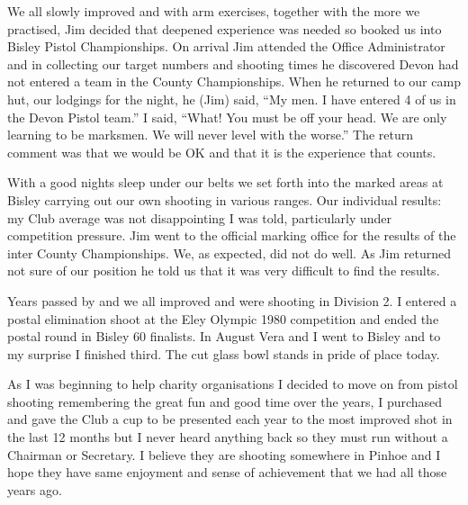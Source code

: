We all slowly improved and with arm exercises, together with the more we
practised, Jim decided that deepened experience was needed so booked us into
Bisley Pistol Championships.  On arrival Jim attended the Office Administrator
and in collecting our target numbers and shooting times he discovered Devon had
not entered a team in the County Championships.  When he returned to our camp
hut, our lodgings for the night, he (Jim) said, ``My men.  I have entered 4 of
us in the Devon Pistol team.''  I said, ``What! You must be off your head.  We
are only learning to be marksmen.  We will never level with the worse.''  The
return comment was that we would be OK and that it is the experience that
counts.

With a good nights sleep under our belts we set forth into the marked areas at
Bisley carrying out our own shooting in various ranges.  Our individual
results: my Club average was not disappointing I was told, particularly under
competition pressure.  Jim went to the official marking office for the results
of the inter County Championships.  We, as expected, did not do well.  As Jim
returned not sure of our position he told us that it was very difficult to find
the results.

Years passed by and we all improved and were shooting in Division 2.  I entered
a postal elimination shoot at the Eley Olympic 1980 competition and ended the
postal round in Bisley 60 finalists.  In August Vera and I went to Bisley and
to my surprise I finished third.  The cut glass bowl stands in pride of place
today.

As I was beginning to help charity organisations I decided to move on from
pistol shooting remembering the great fun and good time over the years, I
purchased and gave the Club a cup to be presented each year to the most
improved shot in the last 12 months but I never heard anything back so they
must run without a Chairman or Secretary.  I believe they are shooting
somewhere in Pinhoe and I hope they have same enjoyment and sense of
achievement that we had all those years ago.
